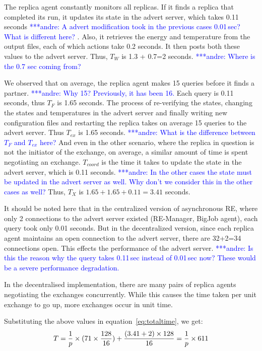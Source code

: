 \documentclass{rspublic}
\newcommand{\alnote}[1]{ {\textcolor{blue} { ***andre: #1 }}}
\newcommand{\alnote}[1]{}
\begin{document}
The replica agent constantly monitors all replicas. If it finds
a replica that completed its run, it updates its state in the advert
server, which takes 0.11 seconds \alnote{A advert modification took in the previous
cases 0.01\,sec? What is different here?}. Also, it retrieves the energy and
temperature from the output files, each of which actions take 0.2
seconds. It then posts both these values to the advert server. Thus,
$T_W$ is 1.3 + 0.7=2 seconds.\alnote{Where is the 0.7 sec coming from?}

We observed that on average, the replica agent makes 15 queries before
it finds a partner.\alnote{Why 15? Previously, it has been 16.} 
Each query is 0.11 seconds, thus $T_F$ is 1.65
seconds. The process of re-verifying the states, changing the states
and temperatures in the advert server and finally writing new
configuration files and restarting the replica takes on average 15
queries to the advert server. Thus $T_{ex}$ is 1.65 seconds. 
\alnote{What is the difference between $T_F$ and $T_{ex}$ here?} 
And even in the other scenario, where the replica in question is not the
initiator of the exchange, on average, a similar amount of time is
spent negotiating an exchange.  $T_{coord}$ is the time it takes to
update the state in the advert server, which is 0.11 seconds. \alnote{In the other
cases the state must be updated in the advert server as well. Why don't we consider
this in the other cases as well?} Thus,
$T_{X}$ is $1.65+1.65+0.11= 3.41$ seconds.

It should be noted here that in the centralized version of
asynchronous RE, where only 2 connections to the advert server existed
(RE-Manager, BigJob agent), each query took only 0.01 seconds. But in
the decentralized version, since each replica agent maintains an open
connection to the advert server, there are 32+2=34 connections
open. This effects the performance of the advert server. \alnote{Is this the reason why
the query takes 0.11\,sec instead of 0.01\,sec now? These would be a severe performance
degradation.}

In the decentralised implementation, there are many pairs of
replica agents negotiating the exchanges concurrently. While this
causes the time taken per unit exchange to go up, more exchanges occur
in unit time.


Substituting the above values in equation~\ref{eq:totaltime}, we get:
\begin{eqnarray}
T=  {1 \over p} \times {{(71\times {128\over 16}}) + {(3.41+2)\times 128\over 16}} = {1 \over p} \times 611
\label{eq:decent}
\end{eqnarray}
\end{document}
